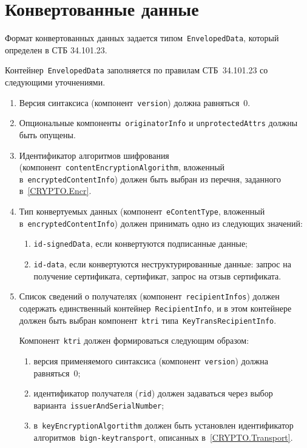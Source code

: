 \section{Конвертованные данные}\label{FMT.EnvelopedData}

Формат конвертованных данных задается типом~\texttt{EnvelopedData}, который
определен в СТБ 34.101.23. 

Контейнер~\texttt{EnvelopedData} заполняется по правилам СТБ~34.101.23
со следующими уточнениями.

\begin{enumerate}
\item
Версия синтаксиса (компонент~\texttt{version}) должна равняться~$0$. 

\item
Опциональные компоненты~\texttt{originatorInfo} и 
\texttt{unprotectedAttrs} должны быть опущены. 

\item
Идентификатор алгоритмов шифрования 
(компонент~\texttt{contentEncryptionAlgorithm}, вложенный  
в~\texttt{encryptedContentInfo}) должен быть выбран из перечня, 
заданного в~\ref{CRYPTO.Encr}.

\item
Тип конвертуемых данных (компонент~\texttt{eContentType}, вложенный 
в~\texttt{encryptedContentInfo}) должен принимать одно из следующих значений:
\begin{enumerate}
\item
\texttt{id-signedData}, если конвертуются подписанные данные;
\item
\texttt{id-data}, если конвертуются неструктурированные данные:
запрос на получение сертификата, сертификат, запрос на отзыв сертификата.
\end{enumerate}

\item
Список сведений о получателях (компонент~\texttt{recipientInfos})
должен содержать единственный контейнер~\texttt{RecipientInfo}, 
и в этом контейнере должен быть выбран компонент~\texttt{ktri} 
типа~\texttt{KeyTransRecipientInfo}. 

Компонент~\texttt{ktri} должен формироваться следующим образом:
\begin{enumerate}
\item
версия применяемого синтаксиса (компонент~\texttt{version})
должна равняться~$0$;
\item
идентификатор получателя (\texttt{rid}) должен задаваться через выбор 
варианта~\texttt{issuerAndSerialNumber};
\item
в~\texttt{keyEncryptionAlgortithm} должен быть установлен идентификатор
алгоритмов~\texttt{bign-keytransport}, описанных в~\ref{CRYPTO.Transport}.
\end{enumerate}
\end{enumerate}